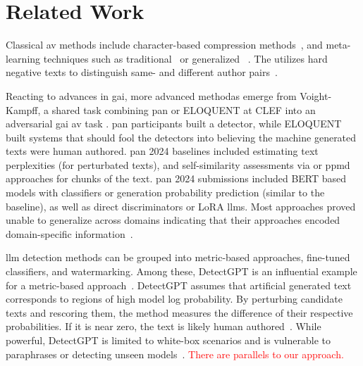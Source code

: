 \chapter{Related Work}
\label{chap:related_work}




Classical \ac{av} methods include character-based compression methods~\citep{tyo_state_2022,neal_surveying_2018}, and meta-learning techniques such as traditional~\citep{koppel_authorship_2004,koppel_authorship_2011} or generalized \unmasking{}~\citep{bevendorff_generalizing_2019,bevendorff_divergence_based_2020}.
The \impAppr{} utilizes hard negative texts to distinguish same- and different author pairs~\citep{koppel_determining_2014}.

Reacting to advances in \ac{gai}, more advanced methodas emerge from Voight-Kampff, a shared task combining \acs{pan} or ELOQUENT at CLEF into an adversarial \ac{gai} \ac{av} task .
\acs{pan} participants built a detector, while ELOQUENT built systems that should fool the detectors into believing the machine generated texts were human authored.
\acs{pan} 2024 baselines included estimating text perplexities (for perturbated texts), and self-similarity assessments via \unmasking{} or \ac{ppmd} approaches for chunks of the text.
\acs{pan} 2024 submissions included BERT based models with classifiers or generation probability prediction (similar to the baseline), as well as direct discriminators or LoRA \acp{llm}.
Most approaches proved unable to generalize across domains indicating that their approaches encoded domain-specific information~\citep{bevendorff_overview_2024}.

\Ac{llm} detection methods can be grouped into metric-based approaches, fine-tuned classifiers, and watermarking. 
Among these, DetectGPT is an influential example for a metric-based approach~\citep{wang_stumbling_2024}.
DetectGPT assumes that artificial generated text corresponds to regions of high model log probability. 
By perturbing candidate texts and rescoring them, the method measures the difference of their respective probabilities.
If it is near zero, the text is likely human authored~\citep{mitchell_detectgpt_2023}. 
While powerful, DetectGPT is limited to white-box scenarios %
and is vulnerable to paraphrases or detecting unseen models~\citep{Wu_ODD_challenges_2025}.
\textcolor{red}{There are parallels to our approach.}

